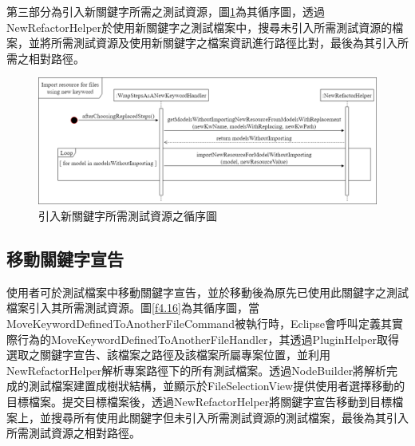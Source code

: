 \indent
第三部分為引入新關鍵字所需之測試資源，圖\ref{f4.15}為其循序圖，透過NewRefactorHelper於使用新關鍵字之測試檔案中，搜尋未引入所需測試資源的檔案，並將所需測試資源及使用新關鍵字之檔案資訊進行路徑比對，最後為其引入所需之相對路徑。

\begin{figure}[H]
	\centering
    \includegraphics[width=1.0\textwidth]{picture/ch4/sequenceDiagram/Import_resource_for_new_keyword_in_eclipse_sequence_diagram.png}
    \caption{引入新關鍵字所需測試資源之循序圖}
    \label{f4.15}
\end{figure}

\subsection{移動關鍵字宣告}
%
\indent
使用者可於測試檔案中移動關鍵字宣告，並於移動後為原先已使用此關鍵字之測試檔案引入其所需測試資源。圖\ref{f4.16}為其循序圖，當MoveKeywordDefinedToAnotherFileCommand被執行時，Eclipse會呼叫定義其實際行為的MoveKeywordDefinedToAnotherFileHandler，其透過PluginHelper取得選取之關鍵字宣告、該檔案之路徑及該檔案所屬專案位置，並利用NewRefactorHelper解析專案路徑下的所有測試檔案。透過NodeBuilder將解析完成的測試檔案建置成樹狀結構，並顯示於FileSelectionView提供使用者選擇移動的目標檔案。提交目標檔案後，透過NewRefactorHelper將關鍵字宣告移動到目標檔案上，並搜尋所有使用此關鍵字但未引入所需測試資源的測試檔案，最後為其引入所需測試資源之相對路徑。

